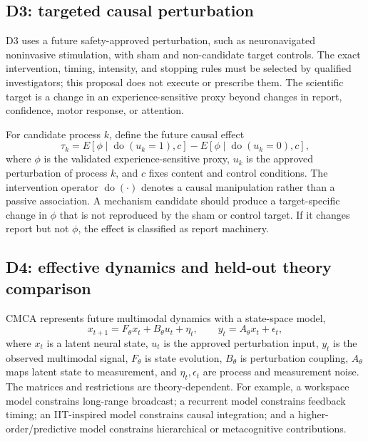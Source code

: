 \documentclass[conference]{IEEEtran}
\newcommand{\IIT}{\textsc{IIT}}
\begin{document}
\subsection{D3: targeted causal perturbation}

D3 uses a future safety-approved perturbation, such as neuronavigated noninvasive stimulation, with sham and non-candidate target controls. The exact intervention, timing, intensity, and stopping rules must be selected by qualified investigators; this proposal does not execute or prescribe them. The scientific target is a change in an experience-sensitive proxy beyond changes in report, confidence, motor response, or attention.

For candidate process $k$, define the future causal effect
\begin{equation}
\tau_k=E[\phi\mid\operatorname{do}(u_k=1),c]-E[\phi\mid\operatorname{do}(u_k=0),c],
\label{eq:causal}
\end{equation}
where $\phi$ is the validated experience-sensitive proxy, $u_k$ is the approved perturbation of process $k$, and $c$ fixes content and control conditions. The intervention operator $\operatorname{do}(\cdot)$ denotes a causal manipulation rather than a passive association. A mechanism candidate should produce a target-specific change in $\phi$ that is not reproduced by the sham or control target. If it changes report but not $\phi$, the effect is classified as report machinery.

\subsection{D4: effective dynamics and held-out theory comparison}

CMCA represents future multimodal dynamics with a state-space model,
\begin{equation}
x_{t+1}=F_{\theta}x_t+B_{\theta}u_t+\eta_t,\qquad y_t=A_{\theta}x_t+\epsilon_t,
\label{eq:state}
\end{equation}
where $x_t$ is a latent neural state, $u_t$ is the approved perturbation input, $y_t$ is the observed multimodal signal, $F_{\theta}$ is state evolution, $B_{\theta}$ is perturbation coupling, $A_{\theta}$ maps latent state to measurement, and $\eta_t,\epsilon_t$ are process and measurement noise. The matrices and restrictions are theory-dependent. For example, a workspace model constrains long-range broadcast; a recurrent model constrains feedback timing; an \IIT-inspired model constrains causal integration; and a higher-order/predictive model constrains hierarchical or metacognitive contributions.
\end{document}
